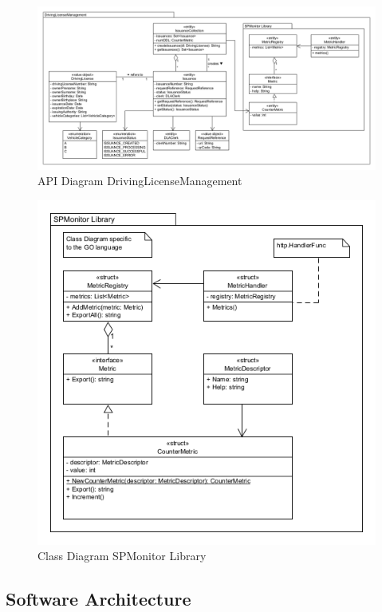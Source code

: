 \begin{figure}[h]
	\centering
	\includegraphics[width=\textwidth]{figures/api_diagram_drivinglicensemanagement.png}
	\caption{API Diagram DrivingLicenseManagement}
	\label{fig:api_diagram_drivinglicensemanagement}
\end{figure}

\begin{figure}[h]
	\centering
	\includegraphics[width=\textwidth]{figures/class_diagram_spmonitor_library.png}
	\caption{Class Diagram SPMonitor Library}
	\label{fig:class_diagram_spmonitor_library}
\end{figure}

\subsection{Software Architecture}

